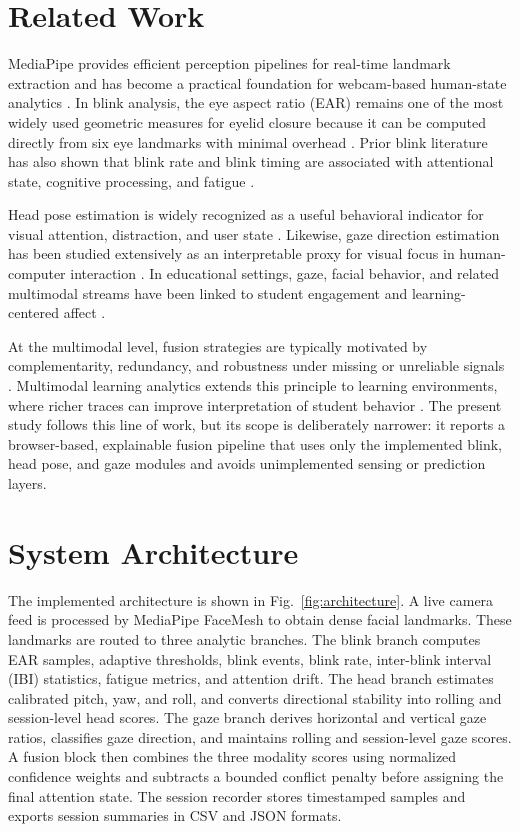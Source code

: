 \documentclass[conference]{IEEEtran}
\begin{document}
\section{Related Work}
MediaPipe provides efficient perception pipelines for real-time landmark extraction and has become a practical foundation for webcam-based human-state analytics \cite{lugaresi2019,kartynnik2019}. In blink analysis, the eye aspect ratio (EAR) remains one of the most widely used geometric measures for eyelid closure because it can be computed directly from six eye landmarks with minimal overhead \cite{soukupova2016}. Prior blink literature has also shown that blink rate and blink timing are associated with attentional state, cognitive processing, and fatigue \cite{stern1984,bentivoglio1997,dinges1998}.

Head pose estimation is widely recognized as a useful behavioral indicator for visual attention, distraction, and user state \cite{murphy2009,asteriadis2009}. Likewise, gaze direction estimation has been studied extensively as an interpretable proxy for visual focus in human-computer interaction \cite{hansen2010,gee1994}. In educational settings, gaze, facial behavior, and related multimodal streams have been linked to student engagement and learning-centered affect \cite{whitehill2014,dmello2012,monkaresi2016,alkabbany2023}.

At the multimodal level, fusion strategies are typically motivated by complementarity, redundancy, and robustness under missing or unreliable signals \cite{atrey2010,baltrusaitis2019}. Multimodal learning analytics extends this principle to learning environments, where richer traces can improve interpretation of student behavior \cite{baker2014,blikstein2013}. The present study follows this line of work, but its scope is deliberately narrower: it reports a browser-based, explainable fusion pipeline that uses only the implemented blink, head pose, and gaze modules and avoids unimplemented sensing or prediction layers.

\section{System Architecture}
The implemented architecture is shown in Fig.~\ref{fig:architecture}. A live camera feed is processed by MediaPipe FaceMesh to obtain dense facial landmarks. These landmarks are routed to three analytic branches. The blink branch computes EAR samples, adaptive thresholds, blink events, blink rate, inter-blink interval (IBI) statistics, fatigue metrics, and attention drift. The head branch estimates calibrated pitch, yaw, and roll, and converts directional stability into rolling and session-level head scores. The gaze branch derives horizontal and vertical gaze ratios, classifies gaze direction, and maintains rolling and session-level gaze scores. A fusion block then combines the three modality scores using normalized confidence weights and subtracts a bounded conflict penalty before assigning the final attention state. The session recorder stores timestamped samples and exports session summaries in CSV and JSON formats.
\end{document}
